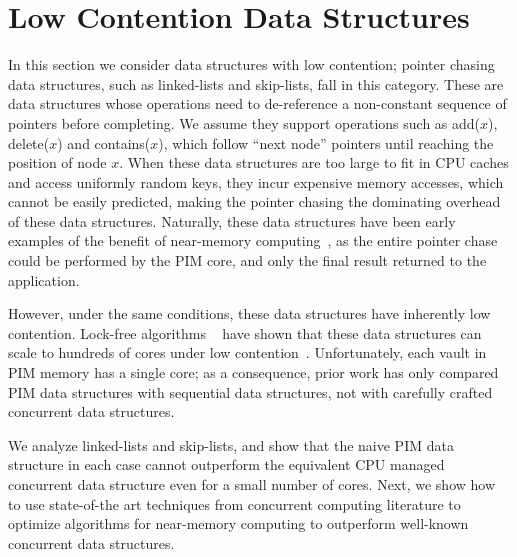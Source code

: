 
\section{Low Contention Data Structures}
\label{section:pointer_chasing}

In this section we consider data structures with low contention; pointer chasing data structures, 
such as linked-lists and skip-lists, fall in this category.  
These are data structures whose operations  
need to de-reference a non-constant sequence of pointers before completing. We assume they support operations 
such as add($x$), delete($x$) and contains($x$), which follow ``next node'' pointers until 
reaching the position of node $x$.
When these data structures are too large to fit in CPU caches 
and access uniformly random keys,
they incur expensive memory accesses, which cannot
be easily predicted, making the pointer chasing the dominating overhead of these data structures.
Naturally, these data structures have been early examples of the benefit of near-memory 
computing~\cite{hsieh2016accelerating}, as the entire pointer chase could be performed by the PIM core, and only the final result returned to 
the application. 

However, under the same conditions, these data structures have inherently low contention. 
Lock-free algorithms
~\cite{practicallf, skiplists-concpugh, valois, Herlihy08}
have shown that these data structures can scale to hundreds of cores under low contention~\cite{nodereplication}. Unfortunately, each vault in 
PIM memory has a single core; as a consequence, prior work 
has only compared PIM data structures with sequential data structures, 
not with carefully crafted concurrent data structures.

We analyze linked-lists and skip-lists, and show that the naive PIM data structure in each case cannot 
outperform the equivalent CPU managed concurrent data structure even for a small number of cores. Next, 
we show how to use state-of-the art techniques from concurrent computing literature to 
optimize algorithms for near-memory computing to outperform well-known concurrent data 
structures. 

